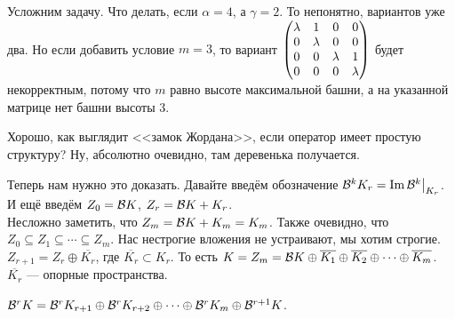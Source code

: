 \documentclass{article}
\DeclareMathOperator{\operIm}{Im}
\let\Im\operIm
\begin{document}
\begin{itemize}
\begin{Example}
            Усложним задачу. Что делать, если $\alpha=4$, а $\gamma=2$. То непонятно, вариантов уже два. Но если добавить условие $m=3$, то вариант $\left(\begin{matrix}
                \lambda & 1 & 0 & 0\\
                0 & \lambda & 0 & 0\\
                0 & 0 & \lambda & 1\\
                0 & 0 & 0 & \lambda
            \end{matrix}\right)$ будет некорректным, потому что $m$ равно высоте максимальной башни, а на указанной матрице нет башни высоты 3.
        \end{Example}
        \begin{Example}
            Хорошо, как выглядит <<замок Жордана>>, если оператор имеет простую структуру? Ну, абсолютно очевидно, там деревенька получается.
        \end{Example}
        \begin{Comment}
            Теперь нам нужно это доказать. Давайте введём обозначение $\scriptB^kK_r=\Im\scriptB^k\big|_{K_r}$. И ещё введём $Z_0={\mathcal{B}} K$, $Z_r={\mathcal{B}} K+K_r$.\\
            Несложно заметить, что $Z_m={\mathcal{B}} K+K_m=K_m$. Также очевидно, что $Z_0\subseteq Z_1\subseteq\cdots\subseteq Z_m$. Нас нестрогие вложения не устраивают, мы хотим строгие. $Z_{r+1}=Z_r\oplus\overline{K_r}$, где $\overline{K_r}\subset K_r$. То есть $K=Z_m={\mathcal{B}} K\oplus\overline{K_1}\oplus\overline{K_2}\oplus\cdots\oplus\overline{K_m}$. $\overline{K_r}$ --- опорные пространства.
        \end{Comment}
        \thm ${\mathcal{B}}^rK={\mathcal{B}}^rK_{r+1}\oplus{\mathcal{B}}^rK_{r+2}\oplus\cdots\oplus{\mathcal{B}}^rK_m\oplus{\mathcal{B}}^{r+1}K$.
        \begin{Proof}

\end{Proof}
\end{itemize}
\end{document}
